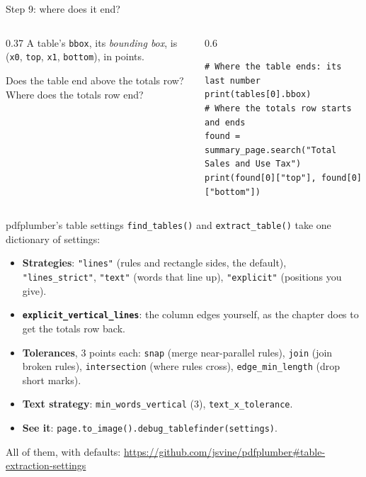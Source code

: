 \documentclass[9pt,aspectratio=169]{beamer}
\begin{document}
\begin{frame}[fragile]{Step 9: where does it end?}
    \begin{columns}[T]
        \begin{column}{0.37\textwidth}
            A table's \texttt{bbox}, its \textit{bounding box}, is (\texttt{x0}, \texttt{top}, \texttt{x1}, \texttt{bottom}), in points.

            \medskip
            Does the table end above the totals row? Where does the totals row end?
        \end{column}
        \begin{column}{0.6\textwidth}
\begin{lstlisting}
# Where the table ends: its last number
print(tables[0].bbox)
# Where the totals row starts and ends
found = summary_page.search("Total Sales and Use Tax")
print(found[0]["top"], found[0]["bottom"])
\end{lstlisting}
        \end{column}
    \end{columns}
\end{frame}

\begin{frame}{pdfplumber's table settings}
    \texttt{find\_tables()} and \texttt{extract\_table()} take one dictionary of settings:
    \begin{itemize}\small
        \item \textbf{Strategies}: \texttt{"lines"} (rules and rectangle sides, the default), \texttt{"lines\_strict"}, \texttt{"text"} (words that line up), \texttt{"explicit"} (positions you give).
        \item \textbf{\texttt{explicit\_vertical\_lines}}: the column edges yourself, as the chapter does to get the totals row back.
        \item \textbf{Tolerances}, 3 points each: \texttt{snap} (merge near-parallel rules), \texttt{join} (join broken rules), \texttt{intersection} (where rules cross), \texttt{edge\_min\_length} (drop short marks).
        \item \textbf{Text strategy}: \texttt{min\_words\_vertical} (3), \texttt{text\_x\_tolerance}.
        \item \textbf{See it}: \texttt{page.to\_image().debug\_tablefinder(settings)}.
    \end{itemize}
    \medskip
    \centering\small All of them, with defaults: \url{https://github.com/jsvine/pdfplumber\#table-extraction-settings}
\end{frame}
\end{document}
